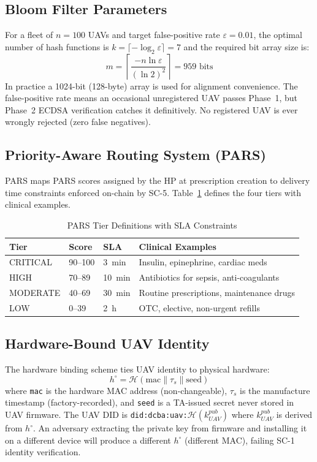 \documentclass[sigplan,screen,review=false]{acmart}
\begin{document}
\subsection{Bloom Filter Parameters}

For a fleet of $n = 100$ UAVs and target false-positive rate
$\varepsilon = 0.01$, the optimal number of hash functions is
$k = \lceil -\log_2 \varepsilon \rceil = 7$ and the required bit array
size is:
\[
  m = \left\lceil \frac{-n \ln \varepsilon}{(\ln 2)^2} \right\rceil = 959 \text{ bits}
\]
In practice a 1024-bit (128-byte) array is used for alignment
convenience. The false-positive rate means an occasional unregistered
UAV passes Phase~1, but Phase~2 ECDSA verification catches it
definitively. No registered UAV is ever wrongly rejected (zero false
negatives).

\subsection{Priority-Aware Routing System (PARS)}

PARS maps PARS scores assigned by the HP at prescription creation to
delivery time constraints enforced on-chain by SC-5. Table~\ref{tab:pars}
defines the four tiers with clinical examples.

\begin{table}[h]
\centering
\caption{PARS Tier Definitions with SLA Constraints}
\label{tab:pars}
\begin{tabular}{@{}p{1.5cm}p{0.9cm}p{1cm}p{3cm}@{}}
\toprule
\textbf{Tier} & \textbf{Score} & \textbf{SLA} & \textbf{Clinical Examples} \\
\midrule
CRITICAL & 90--100 & 3~min  & Insulin, epinephrine, cardiac meds \\
HIGH     & 70--89  & 10~min & Antibiotics for sepsis, anti-coagulants \\
MODERATE & 40--69  & 30~min & Routine prescriptions, maintenance drugs \\
LOW      & 0--39   & 2~h    & OTC, elective, non-urgent refills \\
\bottomrule
\end{tabular}
\end{table}

\subsection{Hardware-Bound UAV Identity}

The hardware binding scheme ties UAV identity to physical hardware:
\[
  h^\circ = \mathcal{H}(\text{mac} \| \tau_s \| \text{seed})
\]
where \texttt{mac} is the hardware MAC address (non-changeable),
$\tau_s$ is the manufacture timestamp (factory-recorded), and
\texttt{seed} is a TA-issued secret never stored in UAV firmware.
The UAV DID is \texttt{did:dcba:uav:$\mathcal{H}(k^{pub}_{UAV})$}
where $k^{pub}_{UAV}$ is derived from $h^\circ$. An adversary
extracting the private key from firmware and installing it on a
different device will produce a different $h^\circ$ (different MAC),
failing SC-1 identity verification.
\end{document}
